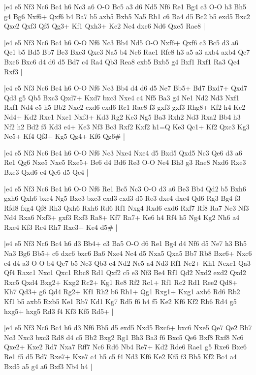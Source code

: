 \whitename{}
\blackname{}
\makegametitle
|e4 e5 Nf3 Nc6 Bc4 h6 Nc3 a6 O-O Bc5 a3 d6 Nd5 Nf6 Re1 Bg4 c3 O-O h3 Bh5 g4 Bg6 Nxf6+ Qxf6 b4 Ba7 b5 axb5 Bxb5 Na5 Rb1 c6 Ba4 d5 Bc2 b5 exd5 Bxc2 Qxc2 Qxf3 Qf5 Qg3+ Kf1 Qxh3+ Ke2 Nc4 dxc6 Nd6 Qxe5 Rae8  |

\whitename{}
\blackname{}
\makegametitle
|e4 e5 Nf3 Nc6 Bc4 h6 O-O Nf6 Nc3 Bb4 Nd5 O-O Nxf6+ Qxf6 c3 Bc5 d3 a6 Qe1 b5 Bd5 Bb7 Be3 Bxe3 Qxe3 Na5 b4 Nc6 Rac1 Rfe8 h3 a5 a3 axb4 axb4 Qe7 Bxc6 Bxc6 d4 d6 d5 Bd7 c4 Ra4 Qb3 Rea8 cxb5 Bxb5 g4 Bxf1 Rxf1 Ra3 Qc4 Rxf3  |

\whitename{}
\blackname{}
\makegametitle
|e4 e5 Nf3 Nc6 Bc4 h6 O-O Nf6 Nc3 Bb4 d4 d6 d5 Ne7 Bb5+ Bd7 Bxd7+ Qxd7 Qd3 g5 Qb5 Bxc3 Qxd7+ Kxd7 bxc3 Nxe4 c4 Nf5 Ba3 g4 Ne1 Nd2 Nd3 Nxf1 Rxf1 Nd4 c5 h5 Bb2 Nxc2 cxd6 cxd6 Rc1 Rac8 f3 gxf3 gxf3 Rhg8+ Kf2 h4 Ke2 Nd4+ Kd2 Rxc1 Nxc1 Nxf3+ Kd3 Rg2 Ke3 Ng5 Ba3 Rxh2 Nd3 Rxa2 Bb4 h3 Nf2 h2 Bd2 f5 Kd3 e4+ Ke3 Nf3 Bc3 Rxf2 Kxf2 h1=Q Ke3 Qc1+ Kf2 Qxc3 Kg3 Ne5+ Kf4 Qf3+ Kg5 Qg4+ Kf6 Qg6\#  |

\whitename{}
\blackname{}
\makegametitle
|e4 e5 Nf3 Nc6 Bc4 h6 O-O Nf6 Nc3 Nxe4 Nxe4 d5 Bxd5 Qxd5 Nc3 Qe6 d3 a6 Re1 Qg6 Nxe5 Nxe5 Rxe5+ Be6 d4 Bd6 Re3 O-O Ne4 Bh3 g3 Rae8 Nxd6 Rxe3 Bxe3 Qxd6 c4 Qe6 d5 Qe4  |

\whitename{}
\blackname{}
\makegametitle
|e4 e5 Nf3 Nc6 Bc4 h6 O-O Nf6 Re1 Bc5 Nc3 O-O d3 a6 Be3 Bb4 Qd2 b5 Bxh6 gxh6 Qxh6 bxc4 Ng5 Bxc3 bxc3 cxd3 cxd3 d5 Re3 dxe4 dxe4 Qd6 Rg3 Bg4 f3 Rfd8 fxg4 Qf8 Rh3 Qxh6 Rxh6 Rd6 Rf1 Nxg4 Rxd6 cxd6 Rxf7 Rf8 Ra7 Ne3 Nf3 Nd4 Rxa6 Nxf3+ gxf3 Rxf3 Ra8+ Kf7 Ra7+ Ke6 h4 Rf4 h5 Ng4 Kg2 Nh6 a4 Rxe4 Kf3 Rc4 Rh7 Rxc3+ Ke4 d5\#  |

\whitename{}
\blackname{}
\makegametitle
|e4 e5 Nf3 Nc6 Bc4 h6 d3 Bb4+ c3 Ba5 O-O d6 Re1 Bg4 d4 Nf6 d5 Ne7 h3 Bh5 Na3 Bg6 Bb5+ c6 dxc6 bxc6 Ba6 Nxe4 Nc4 d5 Nxa5 Qxa5 Bb7 Rb8 Bxc6+ Nxc6 c4 d4 a3 O-O b4 Qc7 b5 Nc3 Qb3 e4 Nd2 Ne5 a4 Nd3 Rf1 Ne2+ Kh1 Nexc1 Qa3 Qf4 Raxc1 Nxc1 Qxc1 Rbc8 Rd1 Qxf2 c5 e3 Nf3 Be4 Rf1 Qd2 Nxd2 exd2 Qxd2 Rxc5 Qxd4 Bxg2+ Kxg2 Rc2+ Kg1 Re8 Rf2 Rc1+ Rf1 Rc2 Rd1 Ree2 Qd8+ Kh7 Qd3+ g6 Qd4 Rg2+ Kf1 Rh2 b6 Rh1+ Qg1 Rxg1+ Kxg1 axb6 Rd6 Rb2 Kf1 b5 axb5 Rxb5 Ke1 Rb7 Kd1 Kg7 Rd5 f6 h4 f5 Ke2 Kf6 Kf2 Rb6 Rd4 g5 hxg5+ hxg5 Rd3 f4 Kf3 Kf5 Rd5+  |

\whitename{}
\blackname{}
\makegametitle
|e4 e5 Nf3 Nc6 Bc4 h6 d3 Nf6 Bb5 d5 exd5 Nxd5 Bxc6+ bxc6 Nxe5 Qe7 Qe2 Bb7 Nc3 Nxc3 bxc3 Rd8 d4 c5 Bb2 Bxg2 Rg1 Bh3 Ba3 f6 Bxc5 Qe6 Bxf8 Rxf8 Nc6 Qxe2+ Kxe2 Rd7 Nxa7 Rff7 Nc6 Rd6 Nb4 Re7+ Kd2 Rde6 Rae1 g5 Rxe6 Bxe6 Re1 f5 d5 Bd7 Rxe7+ Kxe7 c4 h5 c5 f4 Nd3 Kf6 Ke2 Kf5 f3 Bb5 Kf2 Bc4 a4 Bxd5 a5 g4 a6 Bxf3 Nb4 h4  |

